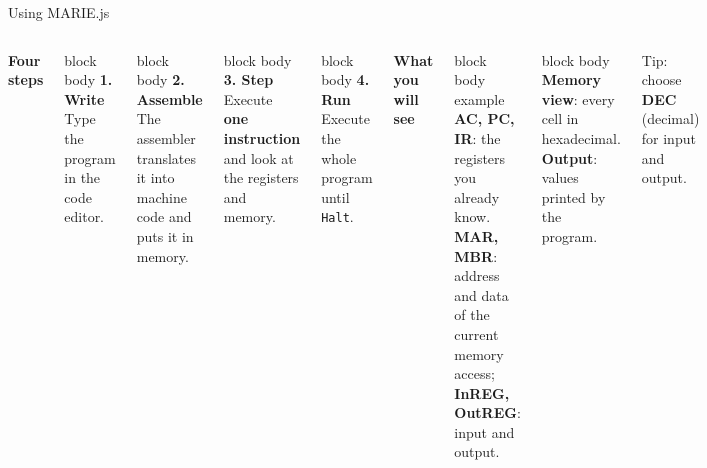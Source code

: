 \documentclass[aspectratio=169,10pt]{beamer}
\newcommand{\stepbox}[2]{%
  \begin{beamercolorbox}[rounded=true,sep=0.09cm,wd=\linewidth]{block body}
    \footnotesize\textbf{#1}\\ #2
  \end{beamercolorbox}\vspace{0.06cm}}
\begin{document}
\begin{frame}{Using MARIE.js}
  \begin{columns}[T,onlytextwidth]
      \footnotesize\textbf{Four steps}\\[0.1cm]
      \stepbox{1. Write}{Type the program in the code editor.}
      \stepbox{2. Assemble}{The assembler translates it into machine code and puts it in memory.}
      \stepbox{3. Step}{Execute \textbf{one instruction} and look at the registers and memory.}
      \stepbox{4. Run}{Execute the whole program until \texttt{Halt}.}
      \footnotesize\textbf{What you will see}\\[0.1cm]
      \begin{beamercolorbox}[rounded=true,sep=0.1cm,wd=\linewidth]{block body example}
        \footnotesize
        \textbf{AC, PC, IR}: the registers you already know.\\
        \textbf{MAR, MBR}: address and data of the current memory access; \textbf{InREG, OutREG}: input and output.
      \end{beamercolorbox}
      \vspace{0.06cm}
      \begin{beamercolorbox}[rounded=true,sep=0.1cm,wd=\linewidth]{block body}
        \footnotesize
        \textbf{Memory view}: every cell in hexadecimal.\\
        \textbf{Output}: values printed by the program.
      \end{beamercolorbox}
      \vspace{0.06cm}
      {\centering\scriptsize\textcolor{DeepBlue}{Tip: choose \textbf{DEC} (decimal) for input and output.}\par}
  \end{columns}
\end{frame}
\end{document}
